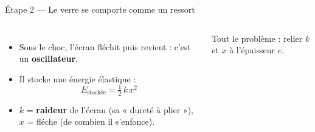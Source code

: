 \documentclass[11pt,aspectratio=169]{beamer}
\begin{document}
\begin{frame}{Étape 2 --- Le verre se comporte comme un ressort}
  \begin{columns}[c]
    \begin{itemize}
      \item Sous le choc, l'écran fléchit puis revient : c'est un
            \textbf{oscillateur}.
      \item Il stocke une énergie élastique :
      \[ E_{\text{stockée}}=\tfrac12\,k\,x^{2} \]
      \item $k$ = \textbf{raideur} de l'écran (sa « dureté à plier »),
            $x$ = fléche (de combien il s'enfonce).
    \end{itemize}
    \vspace{0.2cm}
    \centering\footnotesize\textcolor{verre}{Tout le problème : relier $k$ et $x$
    à l'épaisseur $e$.}
  \end{columns}
\end{frame}
\end{document}
